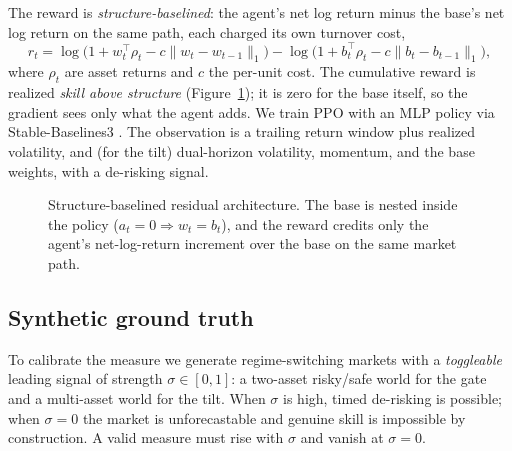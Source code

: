 \documentclass[sigconf,anonymous,review]{acmart}
\begin{document}
The reward is \emph{structure-baselined}: the agent's net log return minus the
base's net log return on the same path, each charged its own turnover cost,
\begin{equation}
r_t = \log\!\big(1 + w_t^\top \rho_t - c\|w_t - w_{t-1}\|_1\big)
    - \log\!\big(1 + b_t^\top \rho_t - c\|b_t - b_{t-1}\|_1\big),
\end{equation}
where $\rho_t$ are asset returns and $c$ the per-unit cost. The cumulative reward is
realized \emph{skill above structure} (Figure~\ref{fig:arch}); it is zero for the base itself, so the
gradient sees only what the agent adds. We train PPO \cite{schulman2017} with an MLP
policy via Stable-Baselines3 \cite{raffin2021}. The observation is a trailing return
window plus realized volatility, and (for the tilt) dual-horizon volatility,
momentum, and the base weights, with a de-risking signal.

\begin{figure}[t]
  \centering
  \caption{Structure-baselined residual architecture. The base is nested inside the
  policy ($a_t=0\Rightarrow w_t=b_t$), and the reward credits only the agent's
  net-log-return increment over the base on the same market path.}
  \label{fig:arch}
\end{figure}

\subsection{Synthetic ground truth}
To calibrate the measure we generate regime-switching markets with a \emph{toggleable}
leading signal of strength $\sigma\in[0,1]$: a two-asset risky/safe world for the
gate and a multi-asset world for the tilt. When $\sigma$ is high, timed de-risking is
possible; when $\sigma=0$ the market is unforecastable and genuine skill is
impossible by construction. A valid measure must rise with $\sigma$ and vanish at
$\sigma=0$.
\end{document}
